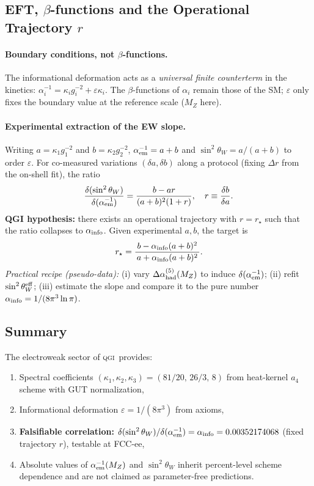 \documentclass{article}
\numberwithin{equation}{section}
\theoremstyle{plain}
\theoremstyle{definition}
\theoremstyle{remark}
\newcommand{\qgi}{\textsc{qgi}}
\newcommand{\ainfoapprox}{0.00352174068}
\begin{document}
\subsection{EFT, $\beta$-functions and the Operational Trajectory $r$}
\label{subsec:eft_rg_path}

\paragraph{Boundary conditions, not $\beta$-functions.}
The informational deformation acts as a \emph{universal finite counterterm} in the kinetics:
$\alpha_i^{-1}=\kappa_i g_i^{-2}+\varepsilon\kappa_i$.
The $\beta$-functions of $\alpha_i$ remain those of the SM; $\varepsilon$ only fixes the boundary value at the reference scale ($M_Z$ here).

\paragraph{Experimental extraction of the EW slope.}
Writing $a=\kappa_1 g_1^{-2}$ and $b=\kappa_2 g_2^{-2}$, 
$
\alpha_{\rm em}^{-1}=a+b
$
and
$
\sin^2\theta_W=a/(a+b)
$
to order $\varepsilon$.
For co-measured variations $(\delta a,\delta b)$ along a protocol (fixing $\Delta r$ from the on-shell fit), the ratio
\[
\frac{\delta(\sin^2\theta_W)}{\delta(\alpha_{\rm em}^{-1})}=\frac{b-a r}{(a+b)^2(1+r)},\quad r\equiv \frac{\delta b}{\delta a}.
\]
\textbf{QGI hypothesis:} there exists an operational trajectory with $r=r_\star$ such that the ratio collapses to $\alpha_{\rm info}$.
Given experimental $a,b$, the target is
\[
r_\star=\frac{\,b-\alpha_{\rm info}(a+b)^2\,}{\,a+\alpha_{\rm info}(a+b)^2\,}.
\]
\emph{Practical recipe (pseudo-data):} (i) vary $\Delta\alpha^{(5)}_{\rm had}(M_Z)$ to induce $\delta(\alpha_{\rm em}^{-1})$; 
(ii) refit $\sin^2\theta_W^{\rm eff}$; 
(iii) estimate the slope and compare it to the pure number $\alpha_{\rm info}=1/(8\pi^3\ln\pi)$.

\subsection{Summary}

The electroweak sector of \qgi\ provides:
\begin{enumerate}
    \item Spectral coefficients $(\kappa_1,\kappa_2,\kappa_3)=(81/20,\,26/3,\,8)$ from heat-kernel $a_4$ scheme with GUT normalization,
    \item Informational deformation $\varepsilon = 1/(8\pi^3)$ from axioms,
    \item \textbf{Falsifiable correlation:} $\delta(\sin^2\theta_W)/\delta(\alpha_{\rm em}^{-1})=\alpha_{\rm info} = \ainfoapprox$ (fixed trajectory $r$), testable at FCC-ee,
    \item Absolute values of $\alpha_{\rm em}^{-1}(M_Z)$ and $\sin^2\theta_W$ inherit percent-level scheme dependence and are not claimed as parameter-free predictions.
\end{enumerate}
\end{document}
